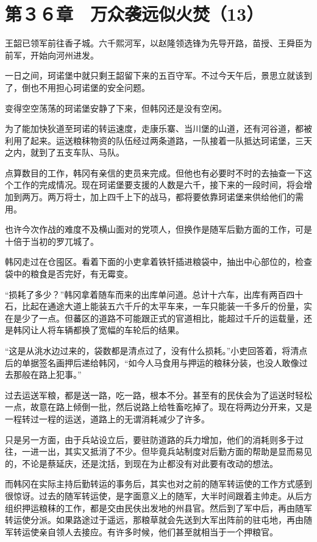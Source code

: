 \section{第３６章　万众袭远似火焚（13）}

王韶已领军前往香子城。六千熙河军，以赵隆领选锋为先导开路，苗授、王舜臣为前军，开始向河州进发。

一日之间，珂诺堡中就只剩王韶留下来的五百守军。不过今天午后，景思立就该到了，倒也不用担心珂诺堡的安全问题。

变得空空荡荡的珂诺堡安静了下来，但韩冈还是没有空闲。

为了能加快狄道至珂诺的转运速度，走康乐寨、当川堡的山道，还有河谷道，都被利用了起来。运送粮秣物资的队伍经过两条道路，一队接着一队抵达珂诺堡，三天之内，就到了五支车队、马队。

点算数目的工作，韩冈有亲信的吏员来完成。但他也有必要时不时的去抽查一下这个工作的完成情况。现在珂诺堡要支援的人数是六千，接下来的一段时间，将会增加到两万。两万将士，加上四千上下的战马，都将要依靠珂诺堡来供给他们的需用。

也许今次作战的难度不及横山面对的党项人，但换作是随军后勤方面的工作，可是十倍于当初的罗兀城了。

韩冈走过在仓囤区。看着下面的小吏拿着铁钎插进粮袋中，抽出中心部位的，检查袋中的粮食是否完好，有无霉变。

“损耗了多少？”韩冈拿着随车而来的出库单问道。总计十六车，出库有两百四十石，比起在通途大道上能装五六千斤的太平车来，一车只能装一千多斤的份量，实在是少了一点。但蕃区的道路不可能跟正式的官道相比，能超过千斤的运载量，还是韩冈让人将车辆都换了宽幅的车轮后的结果。

“这是从洮水边过来的，袋数都是清点过了，没有什么损耗。”小吏回答着，将清点后的单据签名画押后递给韩冈，“如今人马食用与押运的粮秣分装，也没人敢像过去那般在路上犯事。”

过去运送军粮，都是送一路，吃一路，根本不分。甚至有的民伕会为了运送时轻松一点，故意在路上倾倒一批，然后说路上给牲畜吃掉了。现在将两边分开来，又是一程转过一程的运送，道路上的无谓消耗减少了许多。

只是另一方面，由于兵站设立后，要驻防道路的兵力增加，他们的消耗则多于过往，一进一出，其实又抵消了不少。但毕竟兵站制度对后勤方面的帮助是显而易见的，不论是蔡延庆，还是沈括，到现在为止都没有对此要有改动的想法。

而韩冈在实际主持后勤转运的事务后，其实也对之前的随军转运使的工作方式感到很惊讶。过去的随军转运使，是字面意义上的随军，大半时间跟着主帅走。从后方组织押运粮秣的工作，都是交由民伕出发地的州县官。然后到了军中后，再由随军转运使分派。如果路途过于遥远，那粮草就会先送到大军出阵前的驻屯地，再由随军转运使亲自领人去接应。有许多时候，他们甚至就相当于一个押粮官。

